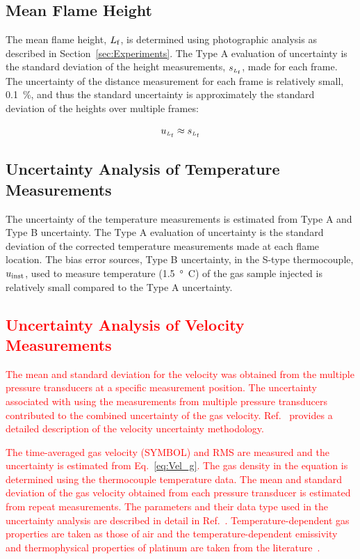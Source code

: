 \documentclass[12pt]{article}
\begin{document}
\subsection{Mean Flame Height}
\label{ssec:Mean_Flame_Height}

The mean flame height, ${L_{\rm{f}}}$, is determined using photographic analysis as described in Section~\ref{sec:Experiments}. The Type A evaluation of uncertainty is the standard deviation of the height measurements, $s_{\scriptscriptstyle L_{\rm{f}}}$, made for each frame. The uncertainty of the distance measurement for each frame is relatively small, 0.1~\%, and thus the standard uncertainty is approximately the standard deviation of the heights over multiple frames:

\begin{equation}
\label{eq:mean_flame_height}
u_{\scriptscriptstyle L_{\rm{f}}} \approx s_{\scriptscriptstyle{L_{\rm f}}}
\end{equation}


\subsection{Uncertainty Analysis of Temperature Measurements}
\label{sec:Uncertainty_Temperature_Measurements}
The uncertainty of the temperature measurements is estimated from Type A and Type B uncertainty. The Type A evaluation of uncertainty is the standard deviation of the corrected temperature measurements made at each flame location. The bias error sources, Type B uncertainty, in the S-type thermocouple, $u_{\rm inst}$, used to measure temperature (\SI{1.5}{\degree C}) of the gas sample injected is relatively small compared to the Type A uncertainty.

\textcolor{red}{\subsection{Uncertainty Analysis of Velocity Measurements}}
\textcolor{red}{The mean and standard deviation for the velocity was obtained from the multiple pressure transducers at a specific measurement position. The uncertainty associated with using the measurements from multiple pressure transducers contributed to the combined uncertainty of the gas velocity. Ref.~\cite{Sung2021} provides a detailed description of the velocity uncertainty methodology.}

\textcolor{red}{The time-averaged gas velocity (SYMBOL) and RMS are measured and the uncertainty is estimated from Eq.~\ref{eq:Vel_g}. The gas density in the equation is determined using the thermocouple temperature data.  The mean and standard deviation of the gas velocity obtained from each pressure transducer is estimated from repeat measurements.  The parameters and their data type used in the uncertainty analysis are described in detail in Ref.~\cite{Sung2021}. Temperature-dependent gas properties are taken as those of air and the temperature-dependent emissivity and thermophysical properties of platinum are taken from the literature~\cite{Sung2021}.}
\end{document}
